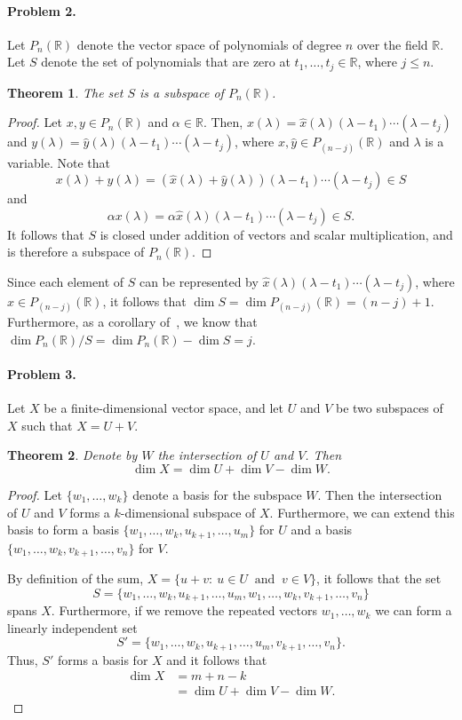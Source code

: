 \documentclass{article}
\newtheorem{theorem}{Theorem}
\begin{document}
\paragraph*{Problem 2.}	Let $P_{n}(\mathbb{R})$ denote the vector space of polynomials of degree $n$ over the field $\mathbb{R}$. Let $S$ denote the set of polynomials that are zero at $t_{1},\ldots,t_{j}\in \mathbb{R}$, where $j\leq n$.
\begin{theorem}
The set $S$ is a subspace of $P_{n}(\mathbb{R})$. 
\end{theorem}
\begin{proof}
Let $x,y\in P_{n}(\mathbb{R})$ and $\alpha\in\mathbb{R}$. Then, $x(\lambda)=\hat{x}(\lambda)(\lambda-t_{1})\cdots(\lambda-t_{j})$ and $y(\lambda)=\hat{y}(\lambda)(\lambda-t_{1})\cdots(\lambda-t_{j})$, where $\hat{x},\hat{y}\in P_{(n-j)}(\mathbb{R})$ and $\lambda$ is a variable. Note that 
\[
x(\lambda)+y(\lambda)=(\hat{x}(\lambda)+\hat{y}(\lambda))(\lambda-t_{1})\cdots(\lambda-t_{j})\in S
\]
and
\[
\alpha x(\lambda)=\alpha\hat{x}(\lambda)(\lambda-t_{1})\cdots(\lambda-t_{j})\in S.
\]
It follows that $S$ is closed under addition of vectors and scalar multiplication, and is therefore a subspace of $P_{n}(\mathbb{R})$. 
\end{proof}
Since each element of $S$ can be represented by $\hat{x}(\lambda)(\lambda-t_{1})\cdots(\lambda-t_{j})$, where $\hat{x}\in P_{(n-j)}(\mathbb{R})$, it follows that $\dim S = \dim P_{(n-j)}(\mathbb{R}) = (n-j)+1$. Furthermore, as a corollary of~\cite[\S 1.6: Problem 35]{Friedberg}, we know that $\dim P_{n}(\mathbb{R})/S = \dim P_{n}(\mathbb{R}) - \dim S = j$. 

\paragraph*{Problem 3.}	Let $X$ be a finite-dimensional vector space, and let $U$ and $V$ be two subspaces of $X$ such that $X=U+V$.
\begin{theorem}
Denote by $W$ the intersection of $U$ and $V$. Then
\[
\dim X = \dim U + \dim V - \dim W.
\]
\end{theorem}
\begin{proof}
Let $\{w_{1},\ldots,w_{k}\}$ denote a basis for the subspace $W$. Then the intersection of $U$ and $V$ forms a $k$-dimensional subspace of $X$. Furthermore, we can extend this basis to form a basis $\{w_{1},\ldots,w_{k},u_{k+1},\ldots,u_{m}\}$ for $U$ and a basis $\{w_{1},\ldots,w_{k},v_{k+1},\ldots,v_{n}\}$ for $V$. 

By definition of the sum, $X=\{u+v\colon~u\in U~\text{ and }~v\in V\}$, it follows that the set
\[
S=\{w_{1},\ldots,w_{k},u_{k+1},\ldots,u_{m},w_{1},\ldots,w_{k},v_{k+1},\ldots,v_{n}\}
\]
spans $X$. Furthermore, if we remove the repeated vectors $w_{1},\ldots,w_{k}$ we can form a linearly independent set
\[
S'=\{w_{1},\ldots,w_{k},u_{k+1},\ldots,u_{m},v_{k+1},\ldots,v_{n}\}.
\]
Thus, $S'$ forms a basis for $X$ and it follows that
\begin{align*}
\dim X &= m + n - k\\
&= \dim U + \dim V - \dim W.
\end{align*}
\end{proof}
\end{document}
